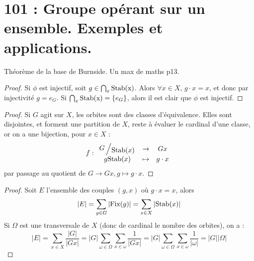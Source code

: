 \twocolumn  %


\section{101 : Groupe opérant sur un ensemble. Exemples et applications.}


\begin{developpements}
	\item Théorème de la base de Burnside. Un max de maths p13.
\end{developpements}
 



\begin{proof}
Si $\phi$ est injectif, soit $g\in  \bigcap_x \textup{Stab(x)}$. Alors $\forall x \in X$, $g\cdot x = x$, et donc par injectivité $g = e_G$. Si $ \bigcap_x \textup{Stab(x)} = \{e_G\}$, alors il est clair que $\phi$ est injectif.
\end{proof}


\begin{proof}
Si $G$ agit sur $X$, les orbites sont des classes d'équivalence. Elles sont disjointes, et forment une partition de $X$, reste à évaluer le cardinal d'une classe, or on a une bijection, pour $x \in X$ :
\[f : \begin{array}{cccc} \bigslant{G}{\textup{Stab}(x)} & \to & G x\\ g \textup{Stab}(x) & \mapsto & g\cdot x\end{array}\]
par passage au quotient de $G \to Gx,g \mapsto g \cdot x$.
\end{proof}



\begin{proof}
Soit $E$ l'ensemble des couples $(g,x)$ où $g\cdot x = x$, alors
\[\vert E \vert = \sum_{g \in G}\vert \textup{Fix}(g)\vert = \sum_{x\in X} \vert \textup{Stab}(x) \vert\]
Si $\Omega$ est une transversale de $X$ (donc de cardinal le nombre des orbites), on a :
\[ \vert E \vert = \sum_{x \in X} \frac{\vert G\vert}{\vert Gx\vert } = \vert G \vert \sum_{ \omega \in \Omega}  \sum_{ x \in \omega} \frac{1}{\vert Gx\vert} = \vert G \vert \sum_{ \omega \in \Omega}  \sum_{ x \in \omega} \frac{1}{\vert \omega\vert}  = \vert G  \vert \vert \Omega \vert \]
\end{proof}

